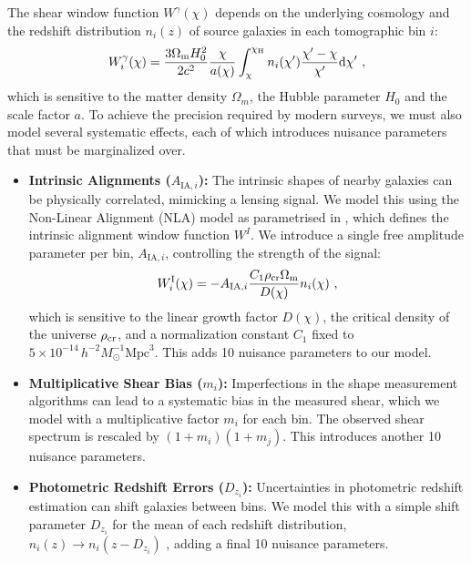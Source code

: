 \documentclass[twocolumn]{openjournal}
\begin{document}
The shear window function $W^\gamma(\chi)$ depends on the underlying cosmology and the redshift distribution $n_i(z)$ of source galaxies in each tomographic bin $i$:
\begin{equation}
	W_i^\gamma (\chi) = \frac{3 \Omega_{\rm m} H_0^2 }{2  c^2} \frac{\chi}{a(\chi)} \int_{\chi}^{\chi_{\rm H}}   n_{i}(\chi')  \frac{\chi'-\chi}{\chi'} \mathrm{d} \chi' \ ,
\end{equation}
which is sensitive to the matter density $\Omega_m$, the Hubble parameter $H_0$ and the scale factor $a$. To achieve the precision required by modern surveys, we must also model several systematic effects, each of which introduces nuisance parameters that must be marginalized over.
\begin{itemize}
    \item \textbf{Intrinsic Alignments ($A_{\text{IA},i}$):} The intrinsic shapes of nearby galaxies can be physically correlated, mimicking a lensing signal. We model this using the Non-Linear Alignment (NLA) model \citep{hirata_04} as parametrised in \citet{Piras_2023}, which defines the intrinsic alignment window function $W^I$. We introduce a single free amplitude parameter per bin, $A_{\text{IA},i}$, controlling the strength of the signal:
    \begin{equation}
    	W_i^{\rm I}(\chi) = - A_{\mathrm{IA}, i}  \frac{C_1  \rho_{\rm cr}  \Omega_{\rm m}}{D(\chi)}  n_{i}(\chi) \ ,
    \end{equation}  
     which is sensitive to the linear growth factor $D(\chi)$, the critical density of the universe $\rho_{\rm cr}$, and a normalization constant $C_1$ fixed to $5 \times 10^{-14} \, h^{-2} M_\odot^{-1} \text{Mpc}^3$.     This adds 10 nuisance parameters to our model.
    \item \textbf{Multiplicative Shear Bias ($m_i$):} Imperfections in the shape measurement algorithms can lead to a systematic bias in the measured shear, which we model with a multiplicative factor $m_i$ for each bin. The observed shear spectrum is rescaled by $(1 + m_i)(1 + m_j)$. This introduces another 10 nuisance parameters.

    \item \textbf{Photometric Redshift Errors ($D_{z_i}$):} Uncertainties in photometric redshift estimation can shift galaxies between bins. We model this with a simple shift parameter $D_{z_i}$ for the mean of each redshift distribution, $n_i(z) \rightarrow n_i(z - D_{z_i})$ \citep{Eifler}, adding a final 10 nuisance parameters.
\end{itemize}
\end{document}

